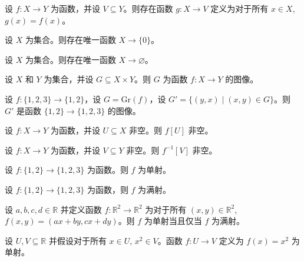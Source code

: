 \begin{chapex} %
设 $f : X \to Y$ 为函数，并设 $V \subseteq Y$。则存在函数 $g : X \to V$ 定义为对于所有 $x \in X$, $g(x) = f(x)$。
\end{chapex}

\begin{chapex} %
设 $X$ 为集合。则存在唯一函数 $X \to \{ 0 \}$。
\end{chapex}

\begin{chapex} %
设 $X$ 为集合。则存在唯一函数 $X \to \varnothing$。
\end{chapex}

\begin{chapex} %
设 $X$ 和 $Y$ 为集合，并设 $G \subseteq X \times Y$。则 $G$ 为函数 $f : X \to Y$ 的图像。
\end{chapex}

\begin{chapex} %
设 $f : \{ 1, 2, 3 \} \to \{ 1, 2 \}$，设 $G = \mathrm{Gr}(f)$，设 $G' = \{ (y,x) \mid (x,y) \in G \}$。则 $G'$ 是函数 $\{ 1, 2 \} \to \{ 1, 2, 3 \}$ 的图像。
\end{chapex}

\begin{chapex} %
设 $f : X \to Y$ 为函数，并设 $U \subseteq X$ 非空。则 $f[U]$ 非空。
\end{chapex}

\begin{chapex} %
设 $f : X \to Y$ 为函数，并设 $V \subseteq Y$ 非空。则 $f^{-1}[V]$ 非空。
\end{chapex}

\begin{chapex} %
设 $f : \{ 1, 2 \} \to \{ 1, 2, 3 \}$ 为函数。则 $f$ 为单射。
\end{chapex}

\begin{chapex} %
设 $f : \{ 1, 2 \} \to \{ 1, 2, 3 \}$ 为函数，则 $f$ 为满射。
\end{chapex}

\begin{chapex} %
设 $a,b,c,d \in \mathbb{R}$ 并定义函数 $f : \mathbb{R}^2 \to \mathbb{R}^2$ 为对于所有 $(x,y) \in \mathbb{R}^2$, $f(x,y) = (ax+by,cx+dy)$。则 $f$ 为单射当且仅当 $f$ 为满射。
\end{chapex}

\begin{chapex} %
\label{cqFunctionsASNEnd}
设 $U, V \subseteq \mathbb{R}$ 并假设对于所有 $x \in U$, $x^2 \in V$。函数 $f : U \to V$ 定义为 $f(x) = x^2$ 为单射。
\end{chapex}